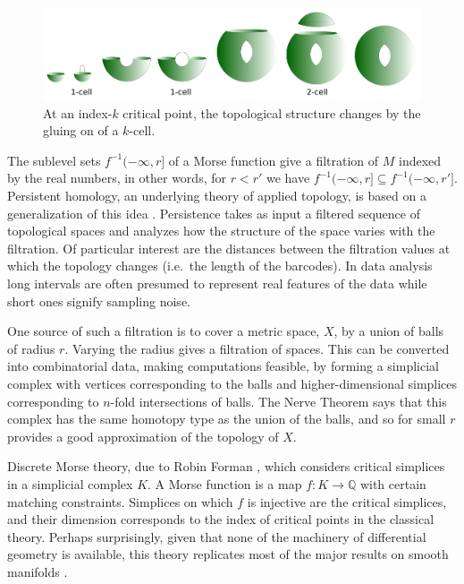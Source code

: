 \documentclass[11pt]{amsart}
\newcommand{\Q}{\mathbb{Q}}
\begin{document}
\begin{figure}[h]
\includegraphics[width=5in]{morse_torus.png}
\caption{At an index-$k$ critical point, the topological structure changes by the gluing on of a $k$-cell.} 
\label{fig:torus}
\end{figure}

The sublevel sets $f^{-1}(-\infty,r]$ of a Morse function give a filtration of $M$ indexed by the real numbers, in other words, for $r < r'$ we have $f^{-1}(-\infty,r] \subseteq f^{-1}(-\infty,r']$.
Persistent homology, an underlying theory of applied topology, is based on a generalization of this idea \cite{EdelsbrunnerComputationalTopologyIntroduction2008}.
Persistence takes as input a filtered sequence of topological spaces and analyzes how the structure of the space varies with the filtration.
Of particular interest are the distances between the filtration values at which the topology changes (i.e.\ the length of the barcodes).
In data analysis long intervals are often presumed to represent real features of the data while short ones signify sampling noise.

One source of such a filtration is to cover a metric space, $X$, by a union of balls of radius $r$.
Varying the radius gives a filtration of spaces.
This can be converted into combinatorial data, making computations feasible, by forming a simplicial complex with vertices corresponding to the balls and higher-dimensional simplices corresponding to $n$-fold intersections of balls.
The Nerve Theorem says that this complex has the same homotopy type as the union of the balls, and so for small $r$ provides a good approximation of the topology of $X$.

Discrete Morse theory, due to Robin Forman \cite{FormanMorseTheoryCell1998}, which considers critical simplices in a simplicial complex $K$.
A Morse function is a map $f \colon K \to \Q$ with certain matching constraints.
Simplices on which $f$ is injective are the critical simplices, and their dimension corresponds to the index of critical points in the classical theory.
Perhaps surprisingly, given that none of the machinery of differential geometry is available, this theory replicates most of the major results on smooth manifolds \cite{BenedettiSmoothingdiscreteMorse2012}.
\end{document}

